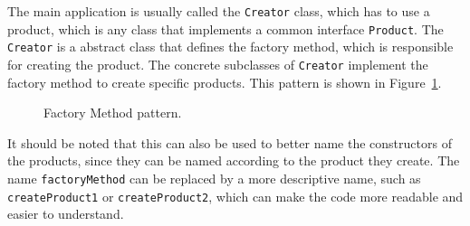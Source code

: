The main application is usually called the \texttt{Creator} class, which has to use a product, which is any class that implements a common interface \texttt{Product}. The \texttt{Creator} is a abstract class that defines the factory method, which is responsible for creating the product. The concrete subclasses of \texttt{Creator} implement the factory method to create specific products. This pattern is shown in Figure~\ref{fig:factory-method}.
\begin{figure}
    \centering
    \caption{Factory Method pattern.}
    \label{fig:factory-method}
\end{figure}
\begin{observacion}
    It should be noted that this can also be used to better name the constructors of the products, since they can be named according to the product they create. The name \texttt{factoryMethod} can be replaced by a more descriptive name, such as \texttt{createProduct1} or \texttt{createProduct2}, which can make the code more readable and easier to understand.
\end{observacion}

